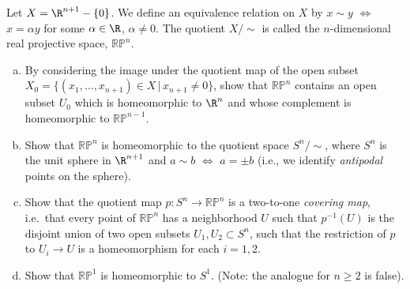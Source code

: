 \documentclass[11pt,letterpaper]{article}
\begin{document}
\begin{problem}
    Let $X=\R^{n+1}-\{0\}$. We define an equivalence relation on $X$ by $x\sim y$ $\Leftrightarrow$ $x=\alpha y$ for some $\alpha\in \R$, $\alpha\neq 0$. The quotient $X/\sim$ is called the $n$-dimensional real projective space, $\mathbb{RP}^n$.
    \begin{enumerate}[(a)]
        \item By considering the image under the quotient map of the open subset $X_0=\{(x_1,\dots,x_{n+1})\in X\,|\,x_{n+1}\neq 0\}$, show that $\mathbb{RP}^n$ contains an open subset $U_0$ which is homeomorphic to $\R^n$ and whose complement is homeomorphic to $\mathbb{RP}^{n-1}$.
        \item Show that $\mathbb{RP}^n$ is homeomorphic to the quotient space $S^n/\sim$, where $S^n$ is the unit sphere in $\R^{n+1}$ and $a\sim b$ $\Leftrightarrow$ $a=\pm b$ (i.e., we identify {\em antipodal} points on the sphere).
        \item Show that the quotient map $p:S^n\to \mathbb{RP}^n$ is a two-to-one {\em covering map}, i.e.\ that every point of $\mathbb{RP}^n$ has a neighborhood $U$ such that $p^{-1}(U)$ is the disjoint union of two open subsets $U_1, U_2\subset S^n$, such that the restriction of $p$ to $U_i\to U$ is a homeomorphism for each $i=1,2$.
        \item Show that $\mathbb{RP}^1$ is homeomorphic to $S^1$. (Note: the analogue for $n\geq 2$ is false).
    \end{enumerate}
\end{problem}
\end{document}
